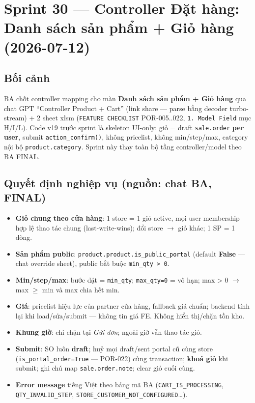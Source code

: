 \chapter{Sprint 30 --- Controller Đặt hàng: Danh sách sản phẩm + Giỏ hàng (2026-07-12)}

\section{Bối cảnh}

BA chốt controller mapping cho màn \textbf{Danh sách sản phẩm + Giỏ hàng} qua chat GPT
``Controller Product + Cart'' (link share --- parse bằng decoder turbo-stream) + 2 sheet xlsm
(\texttt{FEATURE CHECKLIST} POR-005..022, \texttt{1. Model Field} mục H/I/L). Code v19 trước
sprint là skeleton UI-only: giỏ = draft \texttt{sale.order} \textbf{per user}, submit
\texttt{action\_confirm()}, không pricelist, không min/step/max, category nội bộ
\texttt{product.category}. Sprint này thay toàn bộ tầng controller/model theo BA FINAL.

\section{Quyết định nghiệp vụ (nguồn: chat BA, FINAL)}

\begin{itemize}
\item \textbf{Giỏ chung theo cửa hàng}: 1 store = 1 giỏ active, mọi user membership hợp lệ
      thao tác chung (last-write-wins); đổi store $\rightarrow$ giỏ khác; 1 SP = 1 dòng.
\item \textbf{Sản phẩm public}: \texttt{product.product.is\_public\_portal} (default
      \textbf{False} --- chat override sheet), public bắt buộc \texttt{min\_qty > 0}.
\item \textbf{Min/step/max}: bước đặt = \texttt{min\_qty}; \texttt{max\_qty=0} = vô hạn;
      max > 0 $\rightarrow$ max $\geq$ min và max chia hết min.
\item \textbf{Giá}: pricelist hiệu lực của partner cửa hàng, fallback giá chuẩn; backend
      tính lại khi load/sửa/submit --- không tin giá FE. Không hiển thị/chặn tồn kho.
\item \textbf{Khung giờ}: chỉ chặn tại \emph{Gửi đơn}; ngoài giờ vẫn thao tác giỏ.
\item \textbf{Submit}: SO luôn \textbf{draft}; huỷ mọi draft/sent portal cũ cùng store
      (\texttt{is\_portal\_order=True} --- POR-022) cùng transaction; \textbf{khoá giỏ}
      khi submit; ghi chú map \texttt{sale.order.note}; clear giỏ cuối cùng.
\item \textbf{Error message} tiếng Việt theo bảng mã BA (\texttt{CART\_IS\_PROCESSING},
      \texttt{QTY\_INVALID\_STEP}, \texttt{STORE\_CUSTOMER\_NOT\_CONFIGURED}\ldots).
\end{itemize}

